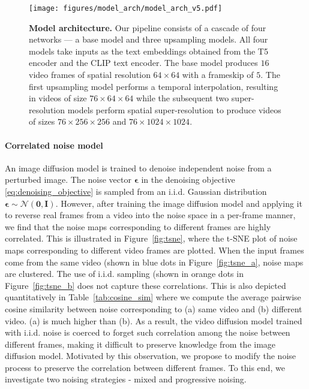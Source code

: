 \documentclass[10pt,twocolumn,letterpaper]{article}
\newcommand{\bzero}{\mathbf{0}}
\newcommand{\bI}{\mathbf{I}}
\newcommand{\cN}{\mathcal{N}}
\newcommand{\beps}{\mathbf{\epsilon}}
\newcommand{\new}[1]{#1}
\begin{document}
\begin{figure*}[t!]
    \centering
    \texttt{[image: figures/model\_arch/model\_arch\_v5.pdf]}
    \caption{\textbf{Model architecture.} Our pipeline consists of a cascade of four networks --- a base model and three upsampling models. All four models take inputs as the text embeddings obtained from the T5 encoder and the CLIP text encoder. The base model produces $16$ video frames of spatial resolution $64 \times 64$ with a frameskip of $5$. The first upsampling model performs a temporal interpolation, resulting in videos of size $76 \times 64 \times 64$ while the subsequent two super-resolution models perform spatial super-resolution to produce videos of sizes $76 \times 256 \times 256$ and $76 \times 1024 \times 1024$.}
    \label{fig:model_arch}
    \vspace{-0.2cm}
\end{figure*} 
\paragraph{Correlated noise model} 
An image diffusion model is trained to denoise independent noise from a perturbed image. The noise vector $\beps$ in the denoising objective \eqref{eq:denoising_objective} is sampled from an i.i.d. Gaussian distribution $\beps \sim \cN(\bzero, \bI)$. However, after training the image diffusion model and applying it to reverse real frames from a video into the noise space in a per-frame manner, we find that the noise maps corresponding to different frames are highly correlated. This is illustrated in Figure~\ref{fig:tsne}, where the t-SNE plot of noise maps corresponding to different video frames are plotted. When the input frames come from the same video (shown in blue dots in Figure~\ref{fig:tsne_a}, noise maps are clustered. The use of i.i.d. sampling (shown in orange dots in Figure~\ref{fig:tsne_b} does not capture these correlations. \new{This is also depicted quantitatively in Table~\ref{tab:cosine_sim} where we compute the average pairwise cosine similarity between noise corresponding to (a) same video and (b) different video. (a) is much higher than (b).} As a result, the video diffusion model \new{trained with i.i.d. noise} is coerced to forget such correlation among the noise between different frames, making it difficult to preserve knowledge from the image diffusion model. Motivated by this observation, we propose to modify the noise process to preserve the correlation between different frames. To this end, we investigate two noising strategies - mixed and progressive noising. 
\end{document}
